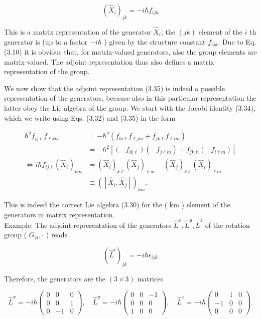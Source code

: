 \documentclass[10pt, letterpaper]{article}
\begin{document}
$$
\left(\hat{X}_{i}\right)_{j k}=-i \hbar f_{i j k}
$$

This is a matrix representation of the generator $\hat{X}_{i}$; the $(j k)$ element of the $i$ th generator is (up to a factor $-i \hbar$ ) given by the structure constant $f_{i j k}$. Due to Eq. (3.10) it is obvious that, for matrix-valued generators, also the group elements are matrix-valued. The adjoint representation thus also defines a matrix representation of the group.

We now show that the adjoint representation (3.35) is indeed a possible representation of the generators, because also in this particular representation the latter obey the Lie algebra of the group. We start with the Jacobi identity (3.34), which we write using Eqs. (3.32) and (3.35) in the form

$$
\begin{aligned}
\hbar^{2} f_{i j \ell} f_{\ell k m} & =-\hbar^{2}\left(f_{k i \ell} f_{\ell j m}+f_{j k \ell} f_{\ell i m}\right) \\
& =-\hbar^{2}\left[\left(-f_{i k \ell}\right)\left(-f_{j \ell m}\right)+f_{j k \ell}\left(-f_{i \ell m}\right)\right] \\
\Longleftrightarrow i \hbar f_{i j \ell}\left(\hat{X}_{\ell}\right)_{k m} & =\left(\hat{X}_{i}\right)_{k \ell}\left(\hat{X}_{j}\right)_{\ell m}-\left(\hat{X}_{j}\right)_{k \ell}\left(\hat{X}_{i}\right)_{\ell m} \\
& \equiv\left(\left[\hat{X}_{i}, \hat{X}_{j}\right]\right)_{k m} .
\end{aligned}
$$

This is indeed the correct Lie algebra (3.30) for the ( km ) element of the generators in matrix representation.\\
Example: The adjoint representation of the generators $\hat{L}^{x}, \hat{L}^{y}, \hat{L}^{z}$ of the rotation group ( $G_{R}, \cdot$ ) reads

$$
\left(\hat{L}^{i}\right)_{j k}=-i \hbar \epsilon_{i j k}
$$

Therefore, the generators are the $(3 \times 3)$ matrices

$$
\hat{L}^{x}=-i \hbar\left(\begin{array}{ccc}
0 & 0 & 0 \\
0 & 0 & 1 \\
0 & -1 & 0
\end{array}\right), \quad \hat{L}^{y}=-i \hbar\left(\begin{array}{ccc}
0 & 0 & -1 \\
0 & 0 & 0 \\
1 & 0 & 0
\end{array}\right), \quad \hat{L}^{z}=-i \hbar\left(\begin{array}{ccc}
0 & 1 & 0 \\
-1 & 0 & 0 \\
0 & 0 & 0
\end{array}\right) .
$$
\end{document}
